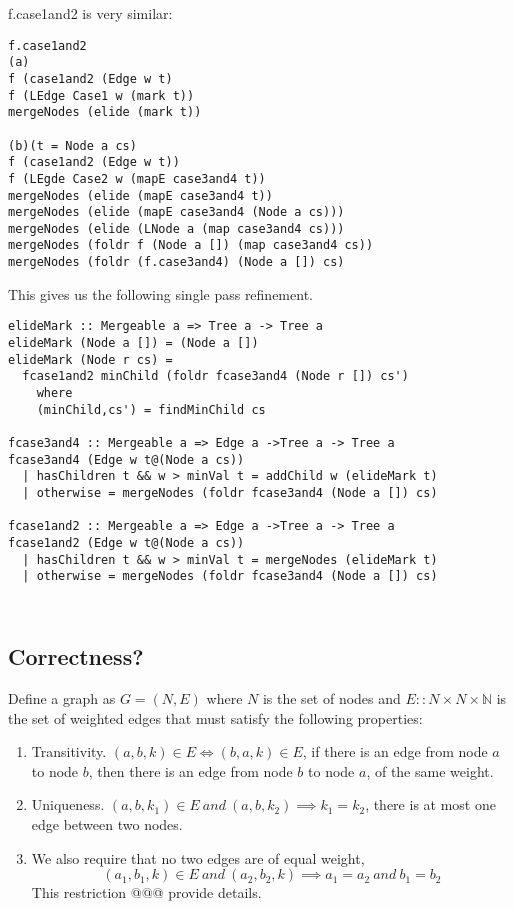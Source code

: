 \documentclass{jfp}
\begin{document}
f.case1and2 is very similar:

\begin{verbatim}
f.case1and2
(a)
f (case1and2 (Edge w t)
f (LEdge Case1 w (mark t))
mergeNodes (elide (mark t))

(b)(t = Node a cs)
f (case1and2 (Edge w t))
f (LEgde Case2 w (mapE case3and4 t))
mergeNodes (elide (mapE case3and4 t))
mergeNodes (elide (mapE case3and4 (Node a cs)))
mergeNodes (elide (LNode a (map case3and4 cs)))
mergeNodes (foldr f (Node a []) (map case3and4 cs))
mergeNodes (foldr (f.case3and4) (Node a []) cs)

\end{verbatim}

This gives us the following single pass refinement.

\begin{verbatim}
elideMark :: Mergeable a => Tree a -> Tree a
elideMark (Node a []) = (Node a [])
elideMark (Node r cs) =
  fcase1and2 minChild (foldr fcase3and4 (Node r []) cs')
    where
    (minChild,cs') = findMinChild cs

fcase3and4 :: Mergeable a => Edge a ->Tree a -> Tree a
fcase3and4 (Edge w t@(Node a cs))
  | hasChildren t && w > minVal t = addChild w (elideMark t)
  | otherwise = mergeNodes (foldr fcase3and4 (Node a []) cs)

fcase1and2 :: Mergeable a => Edge a ->Tree a -> Tree a
fcase1and2 (Edge w t@(Node a cs))
  | hasChildren t && w > minVal t = mergeNodes (elideMark t)
  | otherwise = mergeNodes (foldr fcase3and4 (Node a []) cs)

\end{verbatim}
\begin{verbatim}
\end{verbatim}
\begin{verbatim}
\end{verbatim}


\subsection{Correctness?}

Define a graph as $G = (N,E)$
where $N$ is the set of nodes and $E :: N\times N \times \mathbb{N}$ is the set
of weighted edges
that must satisfy the following properties:
\begin{enumerate}
\item Transitivity. $(a,b,k) \in E \iff (b,a,k) \in E$, if there is an
  edge from node $a$ to node $b$, then there is an edge from node $b$ to
  node $a$, of the same weight.

\item Uniqueness.  $(a,b,k_1) \in E\ and\ (a,b,k_2) \implies k_1 =
  k_2$, there is at most one edge between two nodes.

\item We also require that no two edges are of equal weight,
  \[
  (a_1,b_1,k) \in E\ and\ (a_2,b_2,k) \implies a_1 = a_2\ and\ b_1 =
  b_2
  \]
This restriction @@@ provide details.

\end{enumerate}
\end{document}

